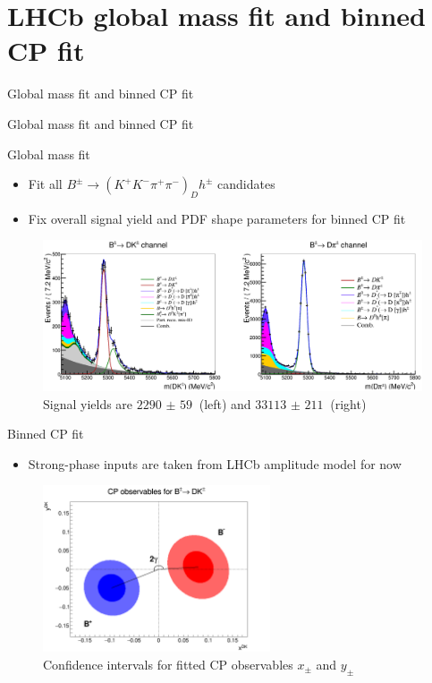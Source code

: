 \documentclass{beamer}
\begin{document}
\section{LHCb global mass fit and binned CP fit}
\begin{frame}{Global mass fit and binned CP fit}
  \begin{center}
    {\huge Global mass fit and binned CP fit} \\
  \end{center}
\end{frame}

\begin{frame}{Global mass fit}
  \begin{itemize}
    \setlength\itemsep{1.3em}
    \item{Fit all $B^\pm\to(K^+K^-\pi^+\pi^-)_Dh^\pm$ candidates}
    \item{Fix overall signal yield and PDF shape parameters for binned CP fit}
  \end{itemize}
  \begin{figure}
    \centering
    \includegraphics[width = 1.0\textwidth]{../Report/Plots/GlobalFit.png}
    \caption{Signal yields are $\SI{2290(59)}{}$ (left) and $\SI{33113(211)}{}$ (right)}
  \end{figure}
\end{frame}

\begin{frame}{Binned CP fit}
  \begin{itemize}
    \setlength\itemsep{1.0em}
    \item{Strong-phase inputs are taken from LHCb amplitude model for now}
  \end{itemize}
  \begin{figure}
    \centering
    \includegraphics[width = 0.6\textwidth]{../Report/Plots/CPContours.png}
    \caption{Confidence intervals for fitted CP observables $x_\pm$ and $y_\pm$}
  \end{figure}
\end{frame}
\end{document}

